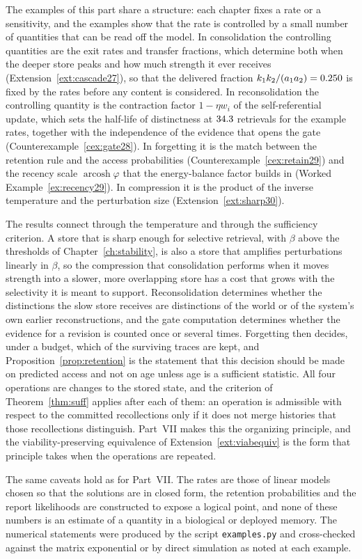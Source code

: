 The examples of this part share a structure: each chapter fixes a rate or a sensitivity, and the examples show that the rate is controlled by a small number of quantities that can be read off the model. In consolidation the controlling quantities are the exit rates and transfer fractions, which determine both when the deeper store peaks and how much strength it ever receives (Extension~\ref{ext:cascade27}), so that the delivered fraction $k_1k_2/(a_1a_2)=0.250$ is fixed by the rates before any content is considered. In reconsolidation the controlling quantity is the contraction factor $1-\eta w_i$ of the self-referential update, which sets the half-life of distinctness at $34.3$ retrievals for the example rates, together with the independence of the evidence that opens the gate (Counterexample~\ref{cex:gate28}). In forgetting it is the match between the retention rule and the access probabilities (Counterexample~\ref{cex:retain29}) and the recency scale $\operatorname{arcosh}\varphi$ that the energy-balance factor builds in (Worked Example~\ref{ex:recency29}). In compression it is the product of the inverse temperature and the perturbation size (Extension~\ref{ext:sharp30}).

The results connect through the temperature and through the sufficiency criterion. A store that is sharp enough for selective retrieval, with $\beta$ above the thresholds of Chapter~\ref{ch:stability}, is also a store that amplifies perturbations linearly in $\beta$, so the compression that consolidation performs when it moves strength into a slower, more overlapping store has a cost that grows with the selectivity it is meant to support. Reconsolidation determines whether the distinctions the slow store receives are distinctions of the world or of the system's own earlier reconstructions, and the gate computation determines whether the evidence for a revision is counted once or several times. Forgetting then decides, under a budget, which of the surviving traces are kept, and Proposition~\ref{prop:retention} is the statement that this decision should be made on predicted access and not on age unless age is a sufficient statistic. All four operations are changes to the stored state, and the criterion of Theorem~\ref{thm:suff} applies after each of them: an operation is admissible with respect to the committed recollections only if it does not merge histories that those recollections distinguish. Part~VII makes this the organizing principle, and the viability-preserving equivalence of Extension~\ref{ext:viabequiv} is the form that principle takes when the operations are repeated.

The same caveats hold as for Part~VII. The rates are those of linear models chosen so that the solutions are in closed form, the retention probabilities and the report likelihoods are constructed to expose a logical point, and none of these numbers is an estimate of a quantity in a biological or deployed memory. The numerical statements were produced by the script \texttt{examples.py} and cross-checked against the matrix exponential or by direct simulation as noted at each example.
